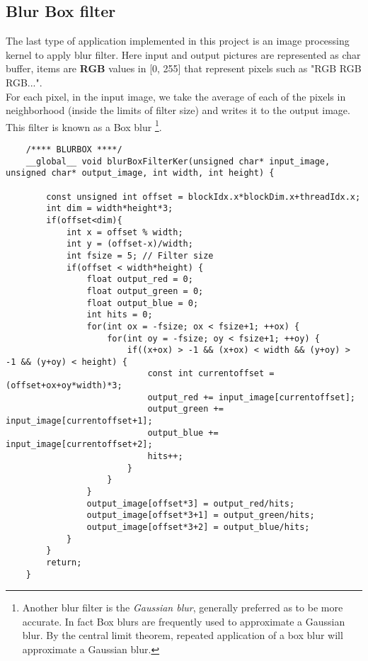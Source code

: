 \subsection{Blur Box filter}
	The last type of application implemented in this project is an image processing kernel to apply blur filter.
	Here input and output pictures are represented as char buffer, items are \textbf{RGB} values in [0, 255] that represent pixels such as "RGB RGB RGB...".\\
	For each pixel, in the input image, we take the average of each of the pixels in neighborhood (inside the limits of filter size) and writes it to the output image. This filter is known as a Box blur \footnote{Another blur filter is the \textit{Gaussian blur}, generally preferred as to be more accurate. In fact Box blurs are frequently used to approximate a Gaussian blur. By the central limit theorem, repeated application of a box blur will approximate a Gaussian blur.}.
	
	\begin{lstlisting}
	/**** BLURBOX ****/
	__global__ void blurBoxFilterKer(unsigned char* input_image, unsigned char* output_image, int width, int height) {
	
		const unsigned int offset = blockIdx.x*blockDim.x+threadIdx.x;
		int dim = width*height*3;
		if(offset<dim){
			int x = offset % width;
			int y = (offset-x)/width;
			int fsize = 5; // Filter size
			if(offset < width*height) {
				float output_red = 0;
				float output_green = 0;
				float output_blue = 0;
				int hits = 0;
				for(int ox = -fsize; ox < fsize+1; ++ox) {
					for(int oy = -fsize; oy < fsize+1; ++oy) {
						if((x+ox) > -1 && (x+ox) < width && (y+oy) > -1 && (y+oy) < height) {
							const int currentoffset = (offset+ox+oy*width)*3;
							output_red += input_image[currentoffset]; 
							output_green += input_image[currentoffset+1];
							output_blue += input_image[currentoffset+2];
							hits++;
						}
					}
				}
				output_image[offset*3] = output_red/hits;
				output_image[offset*3+1] = output_green/hits;
				output_image[offset*3+2] = output_blue/hits;
			}
		}
		return;
	}
	\end{lstlisting}

